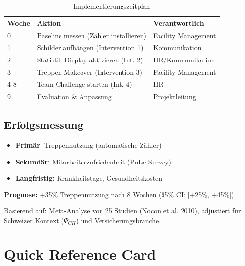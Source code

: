 \documentclass[11pt,a4paper]{article}
\begin{document}
\begin{table}[h]
\centering
\begin{tabular}{lll}
\toprule
\textbf{Woche} & \textbf{Aktion} & \textbf{Verantwortlich} \\
\midrule
0 & Baseline messen (Zähler installieren) & Facility Management \\
1 & Schilder aufhängen (Intervention 1) & Kommunikation \\
2 & Statistik-Display aktivieren (Int. 2) & HR/Kommunikation \\
3 & Treppen-Makeover (Intervention 3) & Facility Management \\
4-8 & Team-Challenge starten (Int. 4) & HR \\
9 & Evaluation \& Anpassung & Projektleitung \\
\bottomrule
\end{tabular}
\caption{Implementierungszeitplan}
\end{table}

\subsection{Erfolgsmessung}

\begin{itemize}[leftmargin=*]
    \item \textbf{Primär:} Treppennutzung (automatische Zähler)
    \item \textbf{Sekundär:} Mitarbeiterzufriedenheit (Pulse Survey)
    \item \textbf{Langfristig:} Krankheitstage, Gesundheitskosten
\end{itemize}

\begin{tcolorbox}[success={Erwartetes Ergebnis}]
\textbf{Prognose:} +35\% Treppennutzung nach 8 Wochen (95\% CI: [+25\%, +45\%])

Basierend auf: Meta-Analyse von 25 Studien (Nocon et al. 2010), adjustiert für Schweizer Kontext ($\Psi_{CH}$) und Versicherungsbranche.
\end{tcolorbox}

\newpage

\section*{\textcolor{fehrblue}{Quick Reference Card}}
\end{document}
